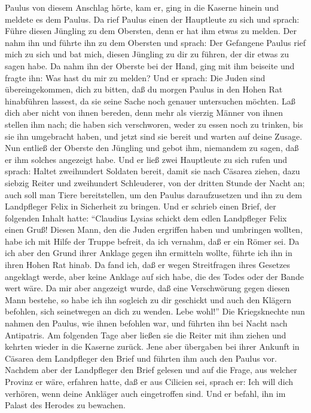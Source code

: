 Paulus von diesem Anschlag hörte, kam er, ging in die Kaserne hinein und
meldete es dem Paulus.  Da rief Paulus einen der
Hauptleute zu sich und sprach: Führe diesen Jüngling zu dem Obersten,
denn er hat ihm etwas zu melden.  Der nahm ihn und führte
ihn zu dem Obersten und sprach: Der Gefangene Paulus rief mich zu sich
und bat mich, diesen Jüngling zu dir zu führen, der dir etwas zu sagen
habe.  Da nahm ihn der Oberste bei der Hand, ging mit ihm
beiseite und fragte ihn: Was hast du mir zu melden?  Und
er sprach: Die Juden sind übereingekommen, dich zu bitten, daß du morgen
Paulus in den Hohen Rat hinabführen lassest, da sie seine Sache noch
genauer untersuchen möchten.  Laß dich aber nicht von
ihnen bereden, denn mehr als vierzig Männer von ihnen stellen ihm nach;
die haben sich verschworen, weder zu essen noch zu trinken, bis sie ihn
umgebracht haben, und jetzt sind sie bereit und warten auf deine Zusage.
 Nun entließ der Oberste den Jüngling und gebot ihm,
niemandem zu sagen, daß er ihm solches angezeigt habe. 
Und er ließ zwei Hauptleute zu sich rufen und sprach: Haltet zweihundert
Soldaten bereit, damit sie nach Cäsarea ziehen, dazu siebzig Reiter und
zweihundert Schleuderer, von der dritten Stunde der Nacht an;
 auch soll man Tiere bereitstellen, um den Paulus
daraufzusetzen und ihn zu dem Landpfleger Felix in Sicherheit zu
bringen.  Und er schrieb einen Brief, der folgenden
Inhalt hatte:  ``Claudius Lysias schickt dem edlen
Landpfleger Felix einen Gruß!  Diesen Mann, den die Juden
ergriffen haben und umbringen wollten, habe ich mit Hilfe der Truppe
befreit, da ich vernahm, daß er ein Römer sei.  Da ich
aber den Grund ihrer Anklage gegen ihn ermitteln wollte, führte ich ihn
in ihren Hohen Rat hinab.  Da fand ich, daß er wegen
Streitfragen ihres Gesetzes angeklagt werde, aber keine Anklage auf sich
habe, die des Todes oder der Bande wert wäre.  Da mir
aber angezeigt wurde, daß eine Verschwörung gegen diesen Mann bestehe,
so habe ich ihn sogleich zu dir geschickt und auch den Klägern befohlen,
sich seinetwegen an dich zu wenden. Lebe wohl!''  Die
Kriegsknechte nun nahmen den Paulus, wie ihnen befohlen war, und führten
ihn bei Nacht nach Antipatris.  Am folgenden Tage aber
ließen sie die Reiter mit ihm ziehen und kehrten wieder in die Kaserne
zurück.  Jene aber übergaben bei ihrer Ankunft in Cäsarea
dem Landpfleger den Brief und führten ihm auch den Paulus vor.
 Nachdem aber der Landpfleger den Brief gelesen und auf
die Frage, aus welcher Provinz er wäre, erfahren hatte, daß er aus
Cilicien sei, sprach er:  Ich will dich verhören, wenn
deine Ankläger auch eingetroffen sind. Und er befahl, ihn im Palast des
Herodes zu bewachen.

